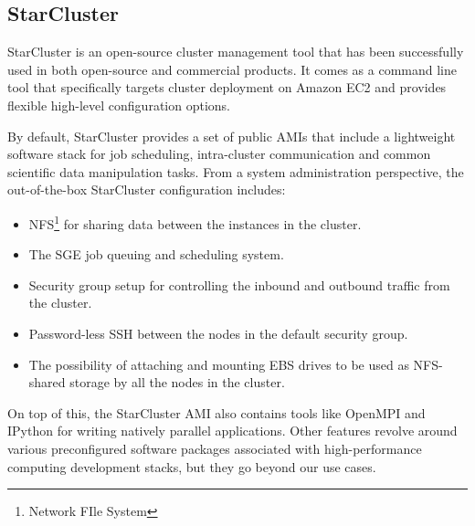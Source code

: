 \subsection{StarCluster}

StarCluster \cite{StarCluster} is an open-source cluster management tool that has been successfully used in both open-source and commercial products. It comes as a command line tool that specifically targets cluster deployment on Amazon EC2 and provides flexible high-level configuration options.

By default, StarCluster provides a set of public AMIs that include a lightweight software stack for job scheduling, intra-cluster communication and common scientific data manipulation tasks. From a system administration perspective, the out-of-the-box StarCluster configuration includes:
\begin{itemize}
	\item NFS\footnote{Network FIle System} \cite{NFS} for sharing data between the instances in the cluster.
	\item The SGE job queuing and scheduling system.
	\item Security group setup for controlling the inbound and outbound traffic from the cluster.
	\item Password-less SSH between the nodes in the default security group.
	\item The possibility of attaching and mounting EBS drives to be used as NFS-shared storage by all the nodes in the cluster.
\end{itemize}

On top of this, the StarCluster AMI also contains tools like OpenMPI \cite{OpenMPI} and IPython \cite{IPython} for writing natively parallel applications. Other features revolve around various preconfigured software packages associated with high-performance computing development stacks, but they go beyond our use cases.


